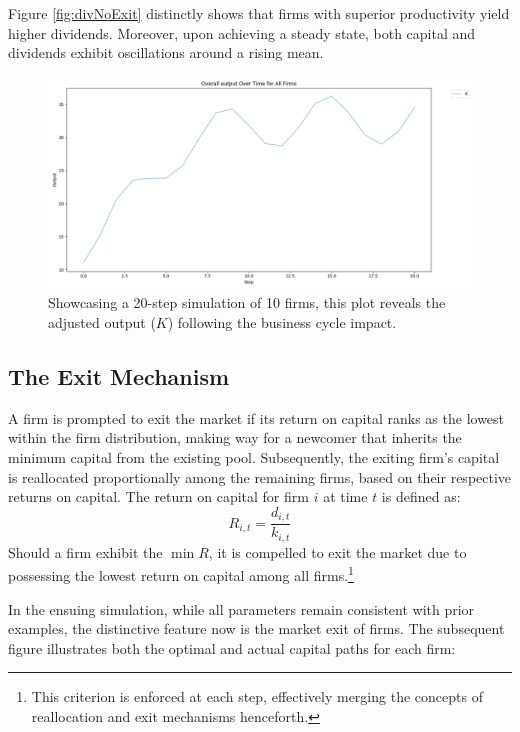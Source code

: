 \documentclass[12pt]{article}
\begin{document}
Figure \ref{fig:divNoExit} distinctly shows that firms with superior productivity yield higher dividends. Moreover, upon
achieving a steady state, both capital and dividends exhibit oscillations around a rising mean. 
\begin{figure}[H]
    \centering
    \includegraphics[scale=0.4]{Output_noexit.png}
    \caption{Showcasing a 20-step simulation of 10 firms, this plot reveals the adjusted output (\( K \)) following the business cycle impact.}
    \label{fig:OutNoExit}
\end{figure}


\subsection{The Exit Mechanism}

A firm is prompted to exit the market if its return on capital ranks as the lowest within the firm distribution, making
way for a newcomer that inherits the minimum capital from the existing pool. Subsequently, the exiting firm's capital is
reallocated proportionally among the remaining firms, based on their respective returns on capital. The return on
capital for firm \( i \) at time \( t \) is defined as: 
\[
R_{i,t} = \frac{d_{i,t}}{k_{i,t}}
\]
Should a firm exhibit the \( \min{R} \), it is compelled to exit the market due to possessing the lowest return on capital
among all firms.\footnote{This criterion is enforced at each step, effectively merging the concepts of reallocation and
exit mechanisms henceforth.} 

In the ensuing simulation, while all parameters remain consistent with prior examples, the distinctive feature now is
the market exit of firms. The subsequent figure illustrates both the optimal and actual capital paths for each firm: 
\end{document}
